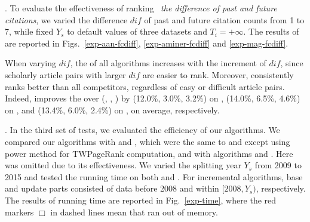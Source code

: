.
To evaluate the effectiveness of ranking \wrt\ {\em the difference of past and future citations},
we varied the difference $dif$ of past and future citation counts from 1 to 7, while fixed $Y_s$ to default values of three datasets and $T_i=+\infty$. The results of \PairAcc are reported in Figs.~\ref{exp-aan-fcdiff}, \ref{exp-aminer-fcdiff} and \ref{exp-mag-fcdiff}.

When varying $dif$, the \PairAcc of all algorithms increases with the increment of $dif$, since scholarly article pairs with larger $dif$ are easier to rank. Moreover, \ensemblerank consistently ranks better than all competitors, regardless of easy or difficult article pairs. Indeed, \ensemblerank improves the \PairAcc over (\pagerank, \futurerank, \hhgrank) by (12.0\%, 3.0\%, 3.2\%) on \aan, (14.0\%, 6.5\%, 4.6\%) on \aminer, and (13.4\%, 6.0\%, 2.4\%) on \magdata, on average, respectively.



.
In the third set of tests, we evaluated the efficiency of our algorithms.
%
We compared our algorithms with \powtwprscc and \powensemble, which were the same to \twprscc and \batensemble except using power method for TWPageRank computation, and with algorithms \futurerank and \hhgrank.
Here \pagerank was omitted due to its effectiveness.
%
We varied the splitting year $Y_s$ from 2009 to 2015 and tested the running time on both \aminer and \magdata.
%
For incremental algorithms, base and update parts consisted of data before 2008 and within $[2008, Y_s)$, respectively.
%
The results of running time are reported in Fig.~\ref{exp-time}, where the red markers $\Box$ in dashed lines mean that \hhgrank ran out of memory.

